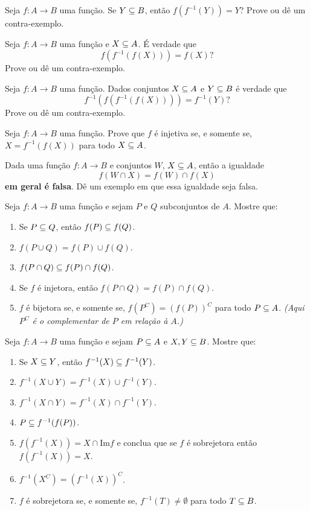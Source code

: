 \documentclass[12pt]{exam}
\begin{document}
\questao{} Seja $f : A \to B$ uma fun\c{c}\~ao. Se $Y \subseteq B$, ent\~ao $f(f^{-1}(Y)) = Y$? Prove ou d\^e um contra-exemplo.

\vspace{.3cm}

\questao{} Seja $f : A \to B$ uma fun\c{c}\~ao e $X \subseteq A$. \'E verdade que
\[
    f(f^{-1}(f(X))) = f(X)?
\]
Prove ou d\^e um contra-exemplo.

\vspace{.3cm}

\questao{} Seja $f : A \to B$ uma fun\c{c}\~ao. Dados conjuntos $X \subseteq A$ e $Y \subseteq B$ \'e verdade que
\[
    f^{-1}(f(f^{-1}(f(X)))) = f^{-1}(Y)?
\]
Prove ou d\^e um contra-exemplo.

\vspace{.3cm}

\questao{} Seja $f : A \to B$ uma fun\c{c}\~ao. Prove que $f$ \'e injetiva se, e somente se, $X = f^{-1}(f(X))$ para todo $X \subseteq A$.

\vspace{.3cm}

\questao{} Dada uma fun\c{c}\~ao $f : A \to B$ e conjuntos $W$, $X \subseteq A$, ent\~ao a igualdade
\[
    f(W \cap X) = f(W) \cap f(X)
\]
\textbf{em geral \'e falsa}. D\^e um exemplo em que essa igualdade seja falsa.

\vspace{.3cm}

\questao{} Seja $f : A \to B$ uma fun\c{c}\~ao e sejam $P$ e $Q$ subconjuntos de $A$. Mostre que:
\begin{enumerate}[label={\alph*})]
    \item Se $P\subseteq Q$, ent{\~a}o $f(P)\subseteq f(Q)$.
    \item $f(P\cup Q) = f(P)\cup f(Q)$.
    \item $f(P\cap Q)\subseteq f(P)\cap f(Q)$.
    \item Se $f$ {\'e} injetora, ent{\~a}o $f(P\cap Q) =  f(P)\cap f(Q)$.
    \item $f$ {\'e} bijetora se, e somente se, $f(P^C) = (f(P))^C$ para todo $P \subseteq A$. \textit{(Aqui $P^C$ \'e o complementar de $P$ em rela\c{c}\~ao \`a $A$.)}
\end{enumerate}

\vspace{.3cm}

\questao{} Seja $f : A \to B$ uma fun{\c c}{\~a}o e sejam $P \subseteq
A$ e $X, Y\subseteq B$. Mostre que:
\begin{enumerate}[label={\alph*})]
    \item Se $X\subseteq Y$, ent{\~a}o $f^{-1}(X)\subseteq f^{-1}(Y)$.
    \item $f^{-1}(X\cup Y)=f^{-1}(X)\cup f^{-1}(Y)$.
    \item $f^{-1}(X\cap Y)= f^{-1}(X)\cap f^{-1}(Y)$.
    \item $P\subseteq f^{-1}(f(P))$.
    \item $f(f^{-1}(X))= X \cap \mbox{Im}f$ e conclua que se $f$ {\'e} sobrejetora ent{\~a}o
    $f(f^{-1}(X))=X$.
    \item $f^{-1}(X^C) = (f^{-1}(X))^C$.
    \item $f$ \'e sobrejetora se, e somente se, $f^{-1}(T) \ne \emptyset$ para todo $T \subseteq B$.
\end{enumerate}
\end{document}
